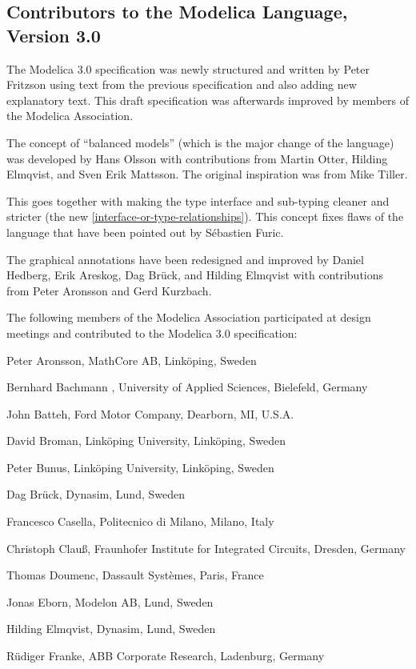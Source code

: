 \documentclass[10pt,a4paper]{report}
\def\doublelabel#1{\label{#1}}
\begin{document}
\subsection{Contributors to the Modelica Language, Version 3.0}\doublelabel{contributors-to-the-modelica-language-version-3-0}

The Modelica 3.0 specification was newly structured and written by Peter
Fritzson using text from the previous specification and also adding new
explanatory text. This draft specification was afterwards improved by
members of the Modelica Association.

The concept of ``balanced models'' (which is the major change of the
language) was developed by Hans Olsson with contributions from Martin
Otter, Hilding Elmqvist, and Sven Erik Mattsson. The original
inspiration was from Mike Tiller.

This goes together with making the type interface and sub-typing cleaner
and stricter (the new \ref{interface-or-type-relationships}). This concept fixes flaws of the
language that have been pointed out by Sébastien Furic.

The graphical annotations have been redesigned and improved by Daniel
Hedberg, Erik Areskog, Dag Brück, and Hilding Elmqvist with
contributions from Peter Aronsson and Gerd Kurzbach.

The following members of the Modelica Association participated at design
meetings and contributed to the Modelica 3.0 specification:

Peter Aronsson, MathCore AB, Linköping, Sweden

Bernhard Bachmann , University of Applied Sciences, Bielefeld, Germany

John Batteh, Ford Motor Company, Dearborn, MI, U.S.A.

David Broman, Linköping University, Linköping, Sweden

Peter Bunus, Linköping University, Linköping, Sweden

Dag Brück, Dynasim, Lund, Sweden

Francesco Casella, Politecnico di Milano, Milano, Italy

Christoph Clauß, Fraunhofer Institute for Integrated Circuits, Dresden,
Germany

Thomas Doumenc, Dassault Systèmes, Paris, France

Jonas Eborn, Modelon AB, Lund, Sweden

Hilding Elmqvist, Dynasim, Lund, Sweden

Rüdiger Franke, ABB Corporate Research, Ladenburg, Germany
\end{document}
